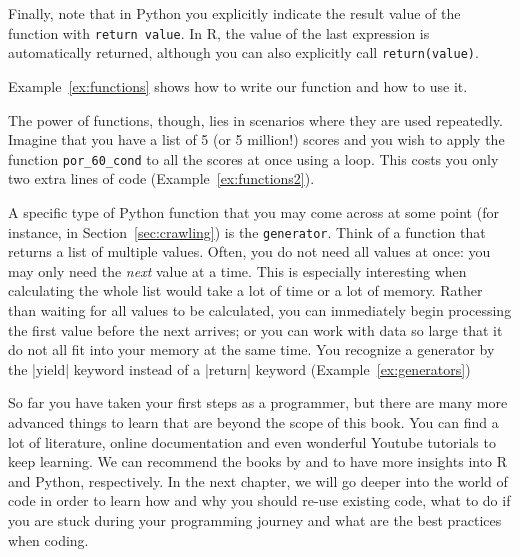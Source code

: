 Finally, note that in Python you explicitly indicate the result value of the function with
\verb|return value|.
In R, the value of the last expression is automatically returned,
although you can also explicitly call \verb|return(value)|. 

Example~\ref{ex:functions} shows how to write our function and how to use it.

The power of functions, though, lies in scenarios where they are used
repeatedly.  Imagine that you have a list of 5 (or 5 million!) scores
and you wish to apply the function \verb|por_60_cond| to all the scores at
once using a loop. This costs you only two extra lines of code
(Example~\ref{ex:functions2}).



\begin{feature}
  A specific type of Python function that you may come across at some point (for instance, in Section~\ref{sec:crawling}) is the \texttt{generator}. 
  Think of a function that returns a list of multiple values. Often, you do not need all values at once: you may only 
  need the \emph{next} value at a time. This is especially interesting when calculating the whole list would take a lot of time or a lot 
  of memory. Rather than waiting for all values to be calculated, you can immediately begin processing the first value before the next arrives; or 
  you can work with data so large that it do not all fit into your memory at the same time.  You recognize a generator by 
  the |yield| keyword instead of a |return| keyword (Example~\ref{ex:generators})
\end{feature}



So far you have taken your first steps as a programmer, but there are many
more advanced things to learn that are beyond the scope of this
book. You can find a lot of literature, online documentation and even
wonderful Youtube tutorials to keep learning. We can recommend the
books by \cite{crawley2012r} and \cite{vanderplas2016python} to have
more insights into R and Python, respectively. In the next chapter, we
will go deeper into the world of code in order to learn how and why
you should re-use existing code, what to do if you are stuck during your
programming journey and what are the best practices when coding.
